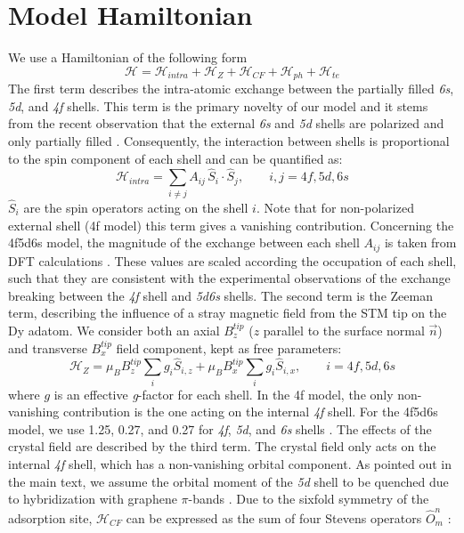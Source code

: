 \documentclass[reprint,amsmath,amssymb,aps,nofootinbib,onecolumn]{revtex4-2}
\begin{document}
\section{Model Hamiltonian}
We use a Hamiltonian of the following form
\begin{equation}
\mathcal{H} = \mathcal{H}_{intra} + \mathcal{H}_{Z} + \mathcal{H}_{CF}  + \mathcal{H}_{ph} + \mathcal{H}_{te}
\end{equation}
The first term describes the intra-atomic exchange between the partially filled \textit{6s}, \textit{5d}, and \textit{4f} shells. This term is the primary novelty of our model and it stems from the recent observation that the external \textit{6s} and \textit{5d} shells are polarized and only partially filled \cite{pivettaMeasuringIntraAtomicExchange2020}. Consequently, the interaction between shells is proportional to the spin component of each shell and can be quantified as:
\begin{equation}
\mathcal{H}_{intra} =\sum_{i\neq j} A_{ij} \, \hat{S}_{i} \cdot \hat{S}_{j} , \qquad i,j = 4f, 5d, 6s
\label{eqSI:H_intra}
\end{equation}
$\hat{S}_{i}$ are the spin operators acting on the shell $i$. Note that for non-polarized external shell (4f model) this term gives a vanishing contribution.
Concerning the 4f5d6s model, the magnitude of the exchange between each shell $A_{ij}$ is taken from DFT calculations \cite{Delin1997,pivettaMeasuringIntraAtomicExchange2020}. These values are scaled according the occupation of each shell, such that they are consistent with the experimental observations of the exchange breaking between the \textit{4f} shell and \textit{5d6s} shells. The second term is the Zeeman term, describing the influence of a stray magnetic field from the STM tip on the Dy adatom. We consider both an axial $B^{tip}_z$ ($z$ parallel to the surface normal $\vec n$) and transverse $B^{tip}_x$ field component, kept as free parameters:
\begin{equation}
\mathcal{H}_{Z} = \mu_{B} B^{tip}_z  \sum_{i} g_{i} \hat{S}_{i,z} + \mu_{B} B^{tip}_x  \sum_{i} g_{i} \hat{S}_{i,x}, \qquad i = 4f, 5d, 6s
\label{eq:zeeman}
\end{equation}
where $g$ is an effective \textit{g}-factor for each shell. In the 4f model, the only non-vanishing contribution is the one acting on the internal \textit{4f} shell. For the 4f5d6s model, we use 1.25, 0.27, and 0.27 for \textit{4f}, \textit{5d}, and \textit{6s} shells \cite{pivettaMeasuringIntraAtomicExchange2020}. The effects of the crystal field are described by the third term. The crystal field only acts on the internal \textit{4f} shell, which has a non-vanishing orbital component. As pointed out in the main text, we assume the orbital moment of the \textit{5d} shell to be quenched due to hybridization with graphene $\pi$-bands \cite{donati2014}. Due to the sixfold symmetry of the adsorption site, $\mathcal{H}_{CF}$ can be expressed as the sum of four Stevens operators $\hat{O}^{n}_{m}$ \cite{baltic2016, Stevens_1952}:
\end{document}
